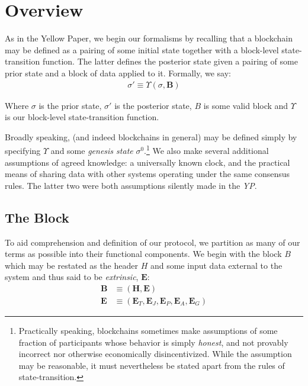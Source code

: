 \section{Overview}\label{sec:overview}

As in the Yellow Paper, we begin our formalisms by recalling that a blockchain may be defined as a pairing of some initial state together with a block-level state-transition function. The latter defines the posterior state given a pairing of some prior state and a block of data applied to it. Formally, we say:
\begin{align}\label{eq:statetransition}
\sigma' \equiv \Upsilon(\sigma, \mathbf{B})
\end{align}

Where $\sigma$ is the prior state, $\sigma'$ is the posterior state, $B$ is some valid block and $\Upsilon$ is our block-level state-transition function.

Broadly speaking, \Jam (and indeed blockchains in general) may be defined simply by specifying $\Upsilon$ and some \emph{genesis state} $\sigma^0$.\footnote{Practically speaking, blockchains sometimes make assumptions of some fraction of participants whose behavior is simply \emph{honest}, and not provably incorrect nor otherwise economically disincentivized. While the assumption may be reasonable, it must nevertheless be stated apart from the rules of state-transition.} We also make several additional assumptions of agreed knowledge: a universally known clock, and the practical means of sharing data with other systems operating under the same consensus rules. The latter two were both assumptions silently made in the \emph{YP}.

\subsection{The Block}

To aid comprehension and definition of our protocol, we partition as many of our terms as possible into their functional components. We begin with the block $B$ which may be restated as the header $H$ and some input data external to the system and thus said to be \emph{extrinsic}, $\mathbf{E}$:
\begin{align}
  \label{eq:block}\mathbf{B} &\equiv (\mathbf{H}, \mathbf{E}) \\
  \label{eq:extrinsic}\mathbf{E} &\equiv (\mathbf{E}_T, \mathbf{E}_J, \mathbf{E}_P, \mathbf{E}_A, \mathbf{E}_G)
\end{align}

